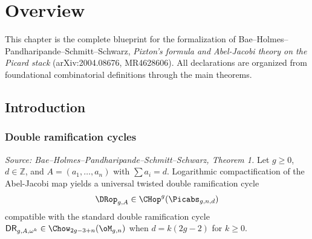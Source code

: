 \chapter{Overview}
\label{chap:overview}


This chapter is the complete blueprint for the formalization of
Bae--Holmes--Pandharipande--Schmitt--Schwarz,
\textit{Pixton's formula and Abel-Jacobi theory on the Picard stack}
(arXiv:2004.08676, MR4628606).
All declarations are organized from foundational combinatorial definitions
through the main theorems.

\section{Introduction}

\subsection{Double ramification cycles}

\begin{theorem}
  \label{thm:dr_existence}
  \textit{Source: Bae--Holmes--Pandharipande--Schmitt--Schwarz, Theorem 1.}
  Let $g \geq 0$, $d \in \mathbb{Z}$, and $A = (a_1,\ldots,a_n)$ with $\sum a_i = d$.
  Logarithmic compactification of the Abel-Jacobi map yields a universal twisted double
  ramification cycle
  \[
    \DRop_{g,A} \in \CHop^g(\Picabs_{g,n,d})
  \]
  compatible with the standard double ramification cycle
  $\mathsf{DR}_{g,A,\omega^k} \in \Chow_{2g-3+n}(\oM_{g,n})$
  when $d = k(2g-2)$ for $k \geq 0$.
\end{theorem}

